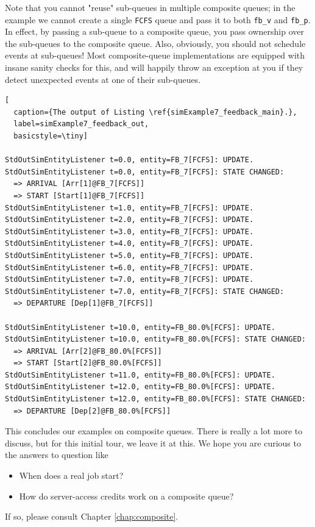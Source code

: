 \documentclass[12pt]{book}
\begin{document}
Note that you cannot "reuse" sub-queues
  in multiple composite queues;
  in the example we cannot create a single
  \lstinline|FCFS| queue and pass it
  to both \lstinline|fb_v| and \lstinline|fb_p|.
In effect,
  by passing a sub-queue to a composite queue,
  you pass ownership over the sub-queues to the
  composite queue.
Also, obviously, you should not schedule events
  at sub-queues!
Most composite-queue implementations
  are equipped with insane sanity checks
  for this, and will happily throw
  an exception at you if they detect
  unexpected events at one of their sub-queues.

\begin{lstfloat}
\begin{lstlisting}[
  caption={The output of Listing \ref{simExample7_feedback_main}.},
  label=simExample7_feedback_out,
  basicstyle=\tiny]

StdOutSimEntityListener t=0.0, entity=FB_7[FCFS]: UPDATE.
StdOutSimEntityListener t=0.0, entity=FB_7[FCFS]: STATE CHANGED:
  => ARRIVAL [Arr[1]@FB_7[FCFS]]
  => START [Start[1]@FB_7[FCFS]]
StdOutSimEntityListener t=1.0, entity=FB_7[FCFS]: UPDATE.
StdOutSimEntityListener t=2.0, entity=FB_7[FCFS]: UPDATE.
StdOutSimEntityListener t=3.0, entity=FB_7[FCFS]: UPDATE.
StdOutSimEntityListener t=4.0, entity=FB_7[FCFS]: UPDATE.
StdOutSimEntityListener t=5.0, entity=FB_7[FCFS]: UPDATE.
StdOutSimEntityListener t=6.0, entity=FB_7[FCFS]: UPDATE.
StdOutSimEntityListener t=7.0, entity=FB_7[FCFS]: UPDATE.
StdOutSimEntityListener t=7.0, entity=FB_7[FCFS]: STATE CHANGED:
  => DEPARTURE [Dep[1]@FB_7[FCFS]]

StdOutSimEntityListener t=10.0, entity=FB_80.0%[FCFS]: UPDATE.
StdOutSimEntityListener t=10.0, entity=FB_80.0%[FCFS]: STATE CHANGED:
  => ARRIVAL [Arr[2]@FB_80.0%[FCFS]]
  => START [Start[2]@FB_80.0%[FCFS]]
StdOutSimEntityListener t=11.0, entity=FB_80.0%[FCFS]: UPDATE.
StdOutSimEntityListener t=12.0, entity=FB_80.0%[FCFS]: UPDATE.
StdOutSimEntityListener t=12.0, entity=FB_80.0%[FCFS]: STATE CHANGED:
  => DEPARTURE [Dep[2]@FB_80.0%[FCFS]]

\end{lstlisting}
\end{lstfloat}

This concludes our examples on composite queues.
There is really a lot more to discuss,
  but for this initial tour,
  we leave it at this.
We hope you are curious to the answers
  to question like
\begin{itemize}
  \item When does a real job start?
  \item How do server-access credits work on a composite queue?
\end{itemize}
If so, please consult Chapter \ref{chap:composite}.
\end{document}

